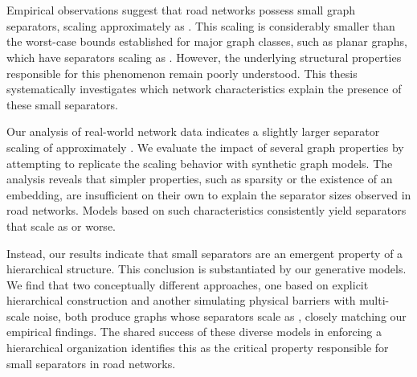 \section*{\abstractname}

Empirical observations suggest that road networks possess small graph separators, scaling approximately as .
This scaling is considerably smaller than the worst-case bounds established for major graph classes, such as planar graphs, which have separators scaling as .
However, the underlying structural properties responsible for this phenomenon remain poorly understood.
This thesis systematically investigates which network characteristics explain the presence of these small separators.

Our analysis of real-world network data indicates a slightly larger separator scaling of approximately .
We evaluate the impact of several graph properties by attempting to replicate the scaling behavior with synthetic graph models.
The analysis reveals that simpler properties, such as sparsity or the existence of an embedding, are insufficient on their own to explain the separator sizes observed in road networks.
Models based on such characteristics consistently yield separators that scale as  or worse.

Instead, our results indicate that small separators are an emergent property of a hierarchical structure.
This conclusion is substantiated by our generative models.
We find that two conceptually different approaches, one based on explicit hierarchical construction and another simulating physical barriers with multi-scale noise, both produce graphs whose separators scale as , closely matching our empirical findings.
The shared success of these diverse models in enforcing a hierarchical organization identifies this as the critical property responsible for small separators in road networks.

